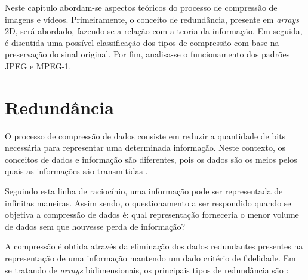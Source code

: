 
\thispagestyle{fancy}

Neste capítulo abordam-se aspectos teóricos do processo de compressão de imagens e vídeos. Primeiramente, o conceito de redundância, presente em \textit{arrays} 2D, será abordado, fazendo-se a relação com a teoria da 
informação. Em seguida, é discutida uma possível classificação dos tipos de compressão com base na preservação do sinal original. Por fim, analisa-se o funcionamento dos padrões JPEG e MPEG-1.

\section{Redundância}
\label{redundancia}

O processo de compressão de dados consiste em reduzir a quantidade de bits necessária para representar uma determinada informação. Neste 
contexto, os conceitos de dados e informação são diferentes, pois os dados são os meios pelos quais as informações são transmitidas 
\cite{Gonzalez2006}.

Seguindo esta linha de raciocínio, uma informação pode ser representada de infinitas maneiras. Assim sendo, o questionamento a ser respondido quando se objetiva a compressão de dados é: qual representação forneceria o menor volume de dados sem que houvesse perda de informação?

A compressão é obtida através da eliminação dos dados redundantes presentes na representação de uma informação mantendo um dado critério de fidelidade. Em se tratando de 
\textit{arrays} bidimensionais, os principais tipos de redundância são \cite{Gonzalez2006}:

